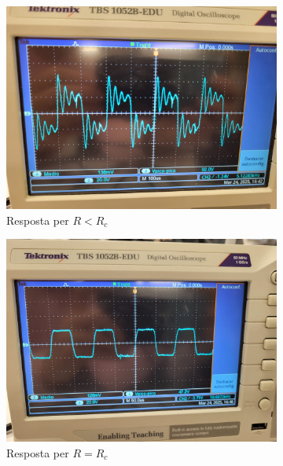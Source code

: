 \documentclass[a4paper,10.5pt]{report}
\begin{document}
\begin{figure}[H]
	\centering
	\begin{subfigure}{0.32\linewidth}
		\centering
		\includegraphics[width=\linewidth]{trans amort.jpeg}
		\caption{Resposta per $R<R_c$}
		\label{fig trans amort}
	\end{subfigure}
	\hfill
	\begin{subfigure}{0.32\linewidth}
		\centering
		\includegraphics[width=\linewidth]{tranas crit.jpeg}
		\caption{Resposta per $R=R_c$}
		\label{fig trans crit}
	\end{subfigure}
	\hfill
	\begin{subfigure}{0.32\linewidth}
		\centering

\end{subfigure}
\end{figure}
\end{document}
